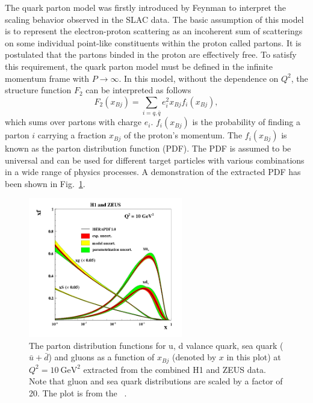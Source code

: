 The quark parton model was firstly introduced by Feynman to interpret the
scaling behavior observed in the SLAC data. The basic assumption of this model
is to represent the electron-proton scattering as an incoherent sum of
scatterings on some individual point-like constituents within the proton called
partons. It is postulated that the partons binded in the proton are effectively
free. To satisfy this requirement, the quark parton model must be defined in the
infinite momentum frame with $P\rightarrow\infty$. In this model, without the
dependence on $Q^{2}$, the structure function $F_{2}$ can be interpreted as
follows
\begin{equation}
F_{2}(x_{Bj})=\sum_{i=q,\bar{q}}e^{2}_{i}x_{Bj}f_{i}(x_{Bj}),
\label{eqn:F2_QPM}
\end{equation}
which sums over partons with charge $e_{i}$. $f_{i}(x_{Bj})$ is the probability
of finding a parton $i$ carrying a fraction $x_{Bj}$ of the proton's momentum.
The $f_{i}(x_{Bj})$ is known as the parton distribution function (PDF). The PDF
is assumed to be universal and can be used for different target particles with
various combinations in a wide range of physics processes. A demonstration of the extracted PDF has been shown in Fig.~\ref{fig:PDF}.
\begin{figure}
\centering
\includegraphics[width=0.6\textwidth]{plots/chpt2/PDF_H1andZEUS.png}
\caption[The parton distributions in a proton extracted from the combined H1 and ZEUS data by the HERAPDF program] {
The parton distribution functions for u, d valance quark, sea quark ($\bar{u}+\bar{d}$) and gluons as a function of $x_{Bj}$ (denoted by $x$ in this plot) at $Q^{2}=10 \ \mathrm{GeV}^{2}$ extracted from the combined H1 and ZEUS data. Note that gluon and sea quark distributions are scaled by a factor of 20. The plot is from the  ~\cite{Aaron:2009aa}.}
\label{fig:PDF}
\end{figure}



